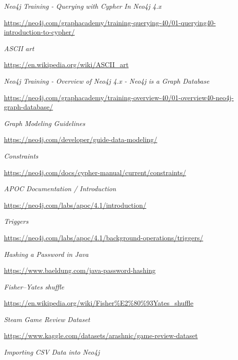 \documentclass[12pt,a4paper]{report}
\begin{document}
\begin{thebibliography}{9}
  \textit{Neo4j Training - Querying with Cypher In Neo4j 4.x}
  
  \url{https://neo4j.com/graphacademy/training-querying-40/01-querying40-introduction-to-cypher/}
  
  
  \textit{ASCII art}
  
  \url{https://en.wikipedia.org/wiki/ASCII_art}
  
  
  \textit{Neo4j Training - Overview of Neo4j 4.x - Neo4j is a Graph Database  }
  
  \url{https://neo4j.com/graphacademy/training-overview-40/01-overview40-neo4j-graph-database/}
  
  
  \textit{Graph Modeling Guidelines}
  
  \url{https://neo4j.com/developer/guide-data-modeling/}
  
  
  \textit{Constraints}
  
  \url{https://neo4j.com/docs/cypher-manual/current/constraints/}
  
  
  \textit{APOC Documentation / Introduction}
  
  \url{https://neo4j.com/labs/apoc/4.1/introduction/}
  
  
  \textit{Triggers}
  
  \url{https://neo4j.com/labs/apoc/4.1/background-operations/triggers/}
  
  
  \textit{Hashing a Password in Java}
  
  \url{https://www.baeldung.com/java-password-hashing}
  
  
  \textit{Fisher–Yates shuffle}
  
  \url{https://en.wikipedia.org/wiki/Fisher%E2%80%93Yates_shuffle}
  
  
  \textit{Steam Game Review Dataset}
  
  \url{https://www.kaggle.com/datasets/arashnic/game-review-dataset}
  
  
  \textit{Importing CSV Data into Neo4j}
  

\end{thebibliography}
\end{document}
